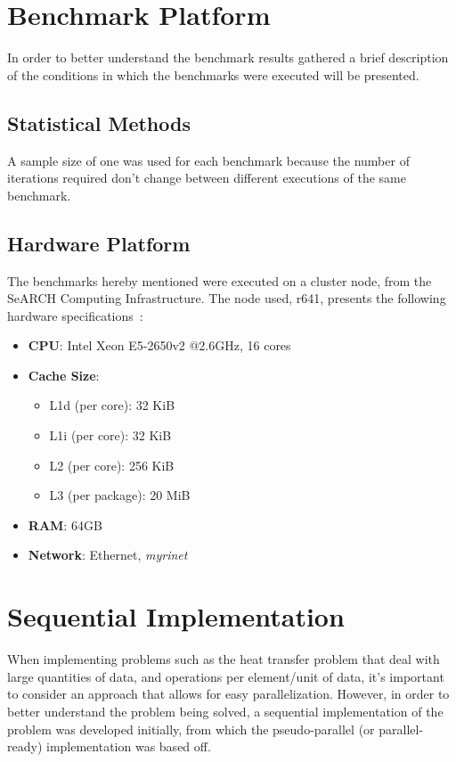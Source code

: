 \documentclass{article}
\begin{document}
\section{Benchmark Platform}
In order to better understand the benchmark results gathered a brief description of the conditions in which the benchmarks were
executed will be presented.

\subsection{Statistical Methods}
A sample size of one was used for each benchmark because the number of iterations required don't change between different executions 
of the same benchmark.

\subsection{Hardware Platform}
The benchmarks hereby mentioned were executed on a cluster node, from the SeARCH Computing Infrastructure. The node used, r641,
presents the following hardware specifications~\cite{cpu,search}:
\begin{itemize}
    \item \textbf{CPU}: Intel Xeon E5-2650v2 @2.6GHz, 16 cores
    \item \textbf{Cache Size}:
    \begin{itemize}
        \item L1d (per core): 32 KiB
        \item L1i (per core): 32 KiB
        \item L2 (per core): 256 KiB
        \item L3 (per package): 20 MiB
    \end{itemize}
    \item \textbf{RAM}: 64GB
    \item \textbf{Network}: Ethernet, \textit{myrinet}
\end{itemize}

\section{Sequential Implementation}
When implementing problems such as the heat transfer problem that deal with large quantities of data, and operations per 
element/unit of data, it's important to consider an approach that allows for easy parallelization. However, in order to better understand the 
problem being solved, a sequential implementation of the problem was developed initially, from which the pseudo-parallel (or parallel-ready)
implementation was based off.
\end{document}
